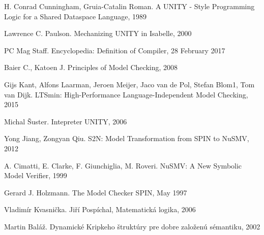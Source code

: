 \documentclass[12pt, a4paper, oneside]{book}
\begin{document}
\begin{thebibliography}{5}
 
  H. Conrad Cunningham, Gruia-Catalin Roman. A UNITY - Style Programming Logic for a Shared Dataspace Language, 1989 

  Lawrence C. Paulson. Mechanizing UNITY in Isabelle, 2000

  PC Mag Staff. Encyclopedia: Definition of Compiler, 28 February 2017

  Baier C., Katoen J. Principles of Model Checking, 2008

  Gijs Kant, Alfons Laarman, Jeroen Meijer, Jaco van de Pol, Stefan Blom1, Tom van Dijk. LTSmin: High-Performance Language-Independent Model Checking, 2015

  Michal Šuster. Intepreter UNITY, 2006

 Yong Jiang, Zongyan Qiu. S2N: Model Transformation from SPIN to NuSMV, 2012

 A. Cimatti, E. Clarke, F. Giunchiglia, M. Roveri. NuSMV: A New Symbolic Model Verifier, 1999

 Gerard J. Holzmann. The Model Checker SPIN, May 1997

 Vladimír Kvasnička. Jiří Pospíchal, Matematická logika, 2006

 Martin Baláž. Dynamické Kripkeho štruktúry pre dobre založenú sémantiku, 2002

\end{thebibliography}
\end{document}
